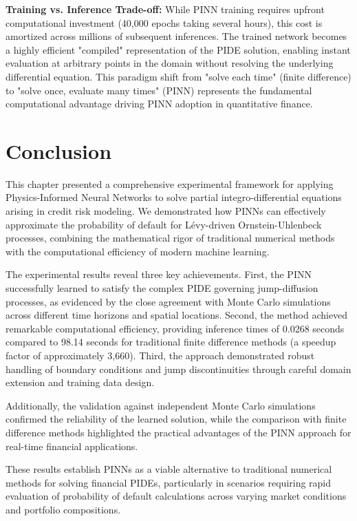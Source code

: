 \documentclass[11pt,twoside,openright]{report}
\begin{document}
\textbf{Training vs. Inference Trade-off:} While PINN training requires upfront computational investment (40,000 epochs taking several hours), this cost is amortized across millions of subsequent inferences. The trained network becomes a highly efficient "compiled" representation of the PIDE solution, enabling instant evaluation at arbitrary points in the domain without resolving the underlying differential equation. This paradigm shift from "solve each time" (finite difference) to "solve once, evaluate many times" (PINN) represents the fundamental computational advantage driving PINN adoption in quantitative finance.

\section{Conclusion}
\label{sec:exp_conclusion}

This chapter presented a comprehensive experimental framework for applying Physics-Informed Neural Networks to solve partial integro-differential equations arising in credit risk modeling. We demonstrated how PINNs can effectively approximate the probability of default for Lévy-driven Ornstein-Uhlenbeck processes, combining the mathematical rigor of traditional numerical methods with the computational efficiency of modern machine learning.

The experimental results reveal three key achievements. First, the PINN successfully learned to satisfy the complex PIDE governing jump-diffusion processes, as evidenced by the close agreement with Monte Carlo simulations across different time horizons and spatial locations. Second, the method achieved remarkable computational efficiency, providing inference times of 0.0268 seconds compared to 98.14 seconds for traditional finite difference methods (a speedup factor of approximately 3,660). Third, the approach demonstrated robust handling of boundary conditions and jump discontinuities through careful domain extension and training data design.

Additionally, the validation against independent Monte Carlo simulations confirmed the reliability of the learned solution, while the comparison with finite difference methods highlighted the practical advantages of the PINN approach for real-time financial applications.

These results establish PINNs as a viable alternative to traditional numerical methods for solving financial PIDEs, particularly in scenarios requiring rapid evaluation of probability of default calculations across varying market conditions and portfolio compositions.
\end{document}
